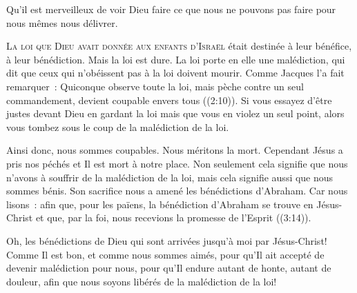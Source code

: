 Qu'il est merveilleux de voir Dieu faire ce que nous ne pouvons pas faire
 pour nous mêmes \ocadr nous délivrer.

\dvrule






\lettrine{L}{a loi que Dieu avait donnée aux enfants d'Israël}
 était destinée à leur bénéfice, à leur bénédiction.
 Mais la loi est dure. La loi porte en elle une malédiction,
 qui dit que ceux qui n'obéissent pas à la loi doivent mourir.
 Comme Jacques l'a fait remarquer~: 
 \og Quiconque observe toute la loi, mais pèche contre un seul commandement,
 devient coupable envers tous \fg{} ((2:10)).
 Si vous essayez d'être justes devant Dieu en gardant la loi
 mais que vous en violez un seul point,
 alors vous tombez sous le coup de la malédiction de la loi.

Ainsi donc, nous sommes coupables. Nous méritons la mort.
 Cependant Jésus a pris nos péchés et Il est mort à notre place.
 Non seulement cela signifie que nous n'avons à souffrir de la malédiction
 de la loi, mais cela signifie aussi que nous sommes bénis.
 Son sacrifice nous a amené les bénédictions d'Abraham.
 Car nous lisons~: 
 \og afin que, pour les païens, la bénédiction d'Abraham se trouve
 en Jésus-Christ et que, par la foi, nous recevions la promesse
 de l'Esprit \fg{} ((3:14)).


Oh, les bénédictions de Dieu qui sont arrivées jusqu'à moi
 par Jésus-Christ! Comme Il est bon, et comme nous sommes aimés,
 pour qu'Il ait accepté de devenir malédiction pour nous,
 pour qu'Il endure autant de honte, autant de douleur,
 afin que nous soyons libérés de la malédiction de la loi!

\dvrule

